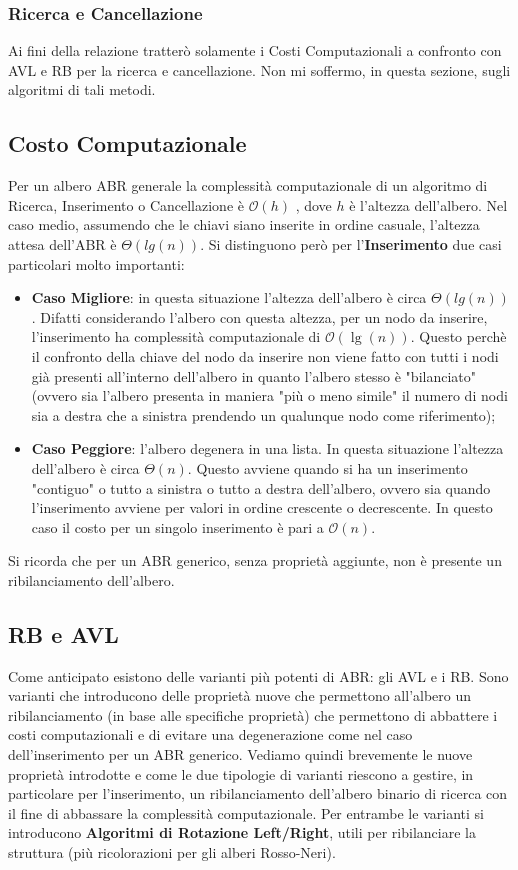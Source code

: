 \subsubsection{Ricerca e Cancellazione}
Ai fini della relazione tratterò solamente i Costi Computazionali a confronto con AVL e RB per la ricerca e cancellazione. Non mi soffermo, in questa sezione, sugli algoritmi di tali metodi.
\subsection{Costo Computazionale}
Per un albero ABR generale la complessità computazionale di un algoritmo di Ricerca, Inserimento o Cancellazione è $\mathcal{O}(h)$ , dove $h$ è l'altezza dell'albero.
Nel caso medio, assumendo che le chiavi siano inserite in ordine
casuale, l'altezza attesa dell'ABR è $\Theta(lg(n))$.
Si distinguono però per l'\textbf{Inserimento} due casi particolari molto importanti:
\begin{itemize}
	\item \textbf{Caso Migliore}: in questa situazione l'altezza dell'albero è circa $\Theta(lg(n))$. Difatti considerando l'albero con questa altezza, per un nodo da inserire, l'inserimento ha complessità computazionale di $\mathcal{O}(\lg(n))$. Questo perchè il confronto della chiave del nodo da inserire non viene fatto con tutti i nodi già presenti all'interno dell'albero in quanto l'albero stesso è "bilanciato" (ovvero sia l'albero presenta in maniera "più o meno simile" il numero di nodi sia a destra che a sinistra prendendo un qualunque nodo come riferimento);
	\item \textbf{Caso Peggiore}: l'albero degenera in una lista. In questa situazione l'altezza dell'albero è circa $\Theta(n)$. Questo avviene quando si ha un inserimento "contiguo" o tutto a sinistra o tutto a destra dell'albero, ovvero sia quando l'inserimento avviene per valori in ordine crescente o decrescente. In questo caso il costo per un singolo inserimento è pari a $\mathcal{O}(n)$.
\end{itemize}
Si ricorda che per un ABR generico, senza proprietà aggiunte, non è presente un ribilanciamento dell'albero.
\subsection{RB e AVL}
Come anticipato esistono delle varianti più potenti di ABR: gli AVL e i RB. Sono varianti che introducono delle proprietà nuove che permettono all'albero un ribilanciamento (in base alle specifiche proprietà) che permettono di abbattere i costi computazionali e di evitare una degenerazione come nel caso dell'inserimento per un ABR generico. Vediamo quindi brevemente le nuove proprietà introdotte e come le due tipologie di varianti riescono a gestire, in particolare per l'inserimento, un ribilanciamento dell'albero binario di ricerca con il fine di abbassare la complessità computazionale.
Per entrambe le varianti si introducono \textbf{Algoritmi di Rotazione Left/Right}, utili per ribilanciare la struttura (più ricolorazioni per gli alberi Rosso-Neri).
